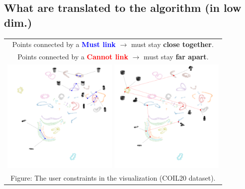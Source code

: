 \documentclass[portrait,final,a0paper]{nadiposter}
\begin{document}
\begin{poster}
{\begin{multicols}{2}
    \section*{\large{What are translated to the algorithm (in low dim.)}}
    \begin{center}
    \begin{tabular}{c}
        Points connected by a \textcolor{blue}{\textbf{Must link}} $\rightarrow$ must stay \textbf{close together}.\\
        Points connected by a \textcolor{red}{\textbf{Cannot link}} $\rightarrow$ must stay \textbf{far apart}.\\
        \includegraphics[height=15em]{poster_NADI_2018/images/example_constrains_COIL20_ML.pdf}
        \includegraphics[height=15em]{poster_NADI_2018/images/example_constrains_COIL20_CL.pdf}\\
        \tiny{Figure: The user constraints in the visualization (COIL20 dataset).}
    \end{tabular}
    \end{center}
\end{multicols}
}


\end{poster}
\end{document}
